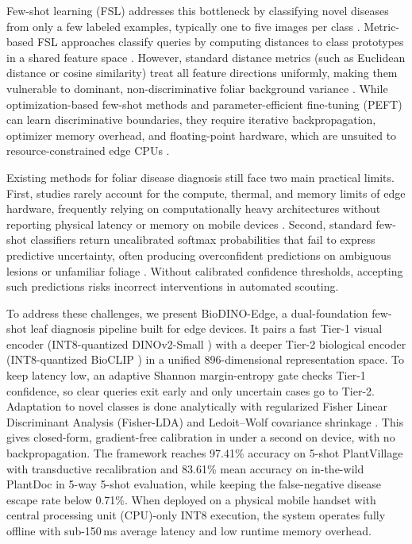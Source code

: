 \documentclass[preprint,12pt]{elsarticle}
\begin{document}
Few-shot learning (FSL) addresses this bottleneck by classifying novel diseases from only a few labeled examples, typically one to five images per class \cite{sun2024few}. Metric-based FSL approaches classify queries by computing distances to class prototypes in a shared feature space \cite{zhao2024mafde}. However, standard distance metrics (such as Euclidean distance or cosine similarity) treat all feature directions uniformly, making them vulnerable to dominant, non-discriminative foliar background variance \cite{yang2024laboratory,kudo2025few}. While optimization-based few-shot methods and parameter-efficient fine-tuning (PEFT) can learn discriminative boundaries, they require iterative backpropagation, optimizer memory overhead, and floating-point hardware, which are unsuited to resource-constrained edge CPUs \cite{babu2025agrifewnet}.

Existing methods for foliar disease diagnosis still face two main practical limits. First, studies rarely account for the compute, thermal, and memory limits of edge hardware, frequently relying on computationally heavy architectures without reporting physical latency or memory on mobile devices \cite{radocaj2025evolution}. Second, standard few-shot classifiers return uncalibrated softmax probabilities that fail to express predictive uncertainty, often producing overconfident predictions on ambiguous lesions or unfamiliar foliage \cite{sharif2026real}. Without calibrated confidence thresholds, accepting such predictions risks incorrect interventions in automated scouting.

To address these challenges, we present BioDINO-Edge, a dual-foundation few-shot leaf diagnosis pipeline built for edge devices. It pairs a fast Tier-1 visual encoder (INT8-quantized DINOv2-Small \cite{oquab2023dinov2}) with a deeper Tier-2 biological encoder (INT8-quantized BioCLIP \cite{stevens2024bioclip}) in a unified 896-dimensional representation space. To keep latency low, an adaptive Shannon margin-entropy gate checks Tier-1 confidence, so clear queries exit early and only uncertain cases go to Tier-2. Adaptation to novel classes is done analytically with regularized Fisher Linear Discriminant Analysis (Fisher-LDA) \cite{fisher1936use} and Ledoit--Wolf covariance shrinkage \cite{ledoit2004well}. This gives closed-form, gradient-free calibration in under a second on device, with no backpropagation. The framework reaches 97.41\% accuracy on 5-shot PlantVillage with transductive recalibration and 83.61\% mean accuracy on in-the-wild PlantDoc in 5-way 5-shot evaluation, while keeping the false-negative disease escape rate below 0.71\%. When deployed on a physical mobile handset with central processing unit (CPU)-only INT8 execution, the system operates fully offline with sub-150\,ms average latency and low runtime memory overhead.
\end{document}
